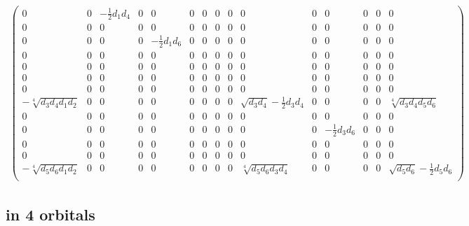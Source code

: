 \documentclass[aip,graphicx]{revtex4-1}
\newcommand{\half}{\frac{1}{2}}
\begin{document}
\begin{itemize}
\begin{eqnarray}
\begin{pmatrix}
         0 & 0 & -\half d_1 d_4 & 0 & 0 & 0 & 0 & 0 & 0 & 0 & 0 & 0 & 0 & 0 & 0 \\
         0 & 0 & 0 & 0 & 0 & 0 & 0 & 0 & 0 & 0 & 0 & 0 & 0 & 0 & 0 \\
         0 & 0 & 0 & 0 & -\half d_1 d_6 & 0 & 0 & 0 & 0 & 0 & 0 & 0 & 0 & 0 & 0 \\
         0 & 0 & 0 & 0 & 0 & 0 & 0 & 0 & 0 & 0 & 0 & 0 & 0 & 0 & 0 \\
         0 & 0 & 0 & 0 & 0 & 0 & 0 & 0 & 0 & 0 & 0 & 0 & 0 & 0 & 0 \\
         0 & 0 & 0 & 0 & 0 & 0 & 0 & 0 & 0 & 0 & 0 & 0 & 0 & 0 & 0 \\
         0 & 0 & 0 & 0 & 0 & 0 & 0 & 0 & 0 & 0 & 0 & 0 & 0 & 0 & 0 \\
         -\sqrt[4]{d_{3}d_{4}d_{1}d_{2}} & 0 & 0 & 0 & 0 & 0 & 0 & 0 & 0 & \sqrt{d_{3}d_{4}}-\half d_3 d_4 & 0 & 0 & 0 & 0 & \sqrt[4]{d_{3}d_{4}d_{5}d_{6}} \\
         0 & 0 & 0 & 0 & 0 & 0 & 0 & 0 & 0 & 0 & 0 & 0 & 0 & 0 & 0 \\
         0 & 0 & 0 & 0 & 0 & 0 & 0 & 0 & 0 & 0 & 0 & -\half d_3 d_6 & 0 & 0 & 0 \\
         0 & 0 & 0 & 0 & 0 & 0 & 0 & 0 & 0 & 0 & 0 & 0 & 0 & 0 & 0 \\
         0 & 0 & 0 & 0 & 0 & 0 & 0 & 0 & 0 & 0 & 0 & 0 & 0 & 0 & 0 \\
         -\sqrt[4]{d_{5}d_{6}d_{1}d_{2}} & 0 & 0 & 0 & 0 & 0 & 0 & 0 & 0 & \sqrt[4]{d_{5}d_{6}d_{3}d_{4}} & 0 & 0 & 0 & 0 & \sqrt{d_{5}d_{6}}-\half d_5 d_6 \\
         \end{pmatrix}  
         \end{eqnarray}
         \normalsize
\end{itemize}

\subsection{ in 4 orbitals}
\end{document}
